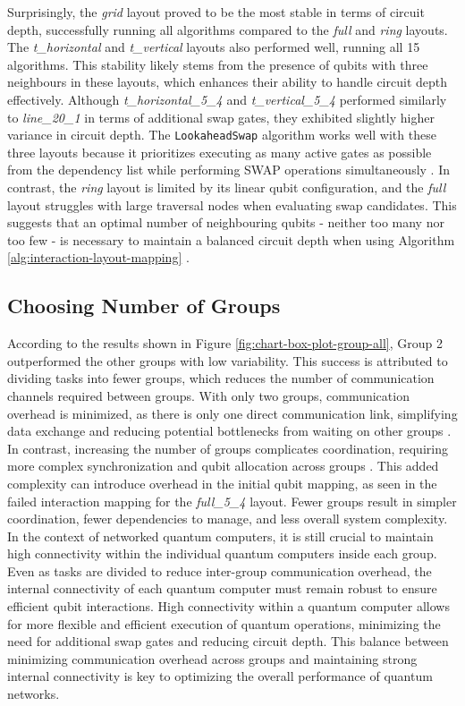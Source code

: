 Surprisingly, the \textit{grid} layout proved to be the most stable in terms of circuit depth, successfully running all algorithms compared to the \textit{full} and \textit{ring} layouts. The \textit{t\_horizontal} and \textit{t\_vertical} layouts also performed well, running all 15 algorithms. This stability likely stems from the presence of qubits with three neighbours in these layouts, which enhances their ability to handle circuit depth effectively. Although \textit{t\_horizontal\_5\_4} and \textit{t\_vertical\_5\_4} performed similarly to \textit{line\_20\_1} in terms of additional swap gates, they exhibited slightly higher variance in circuit depth. The \lstinline{LookaheadSwap} algorithm works well with these three layouts because it prioritizes executing as many active gates as possible from the dependency list while performing SWAP operations simultaneously \cite{zhang_depth_2020}. In contrast, the \textit{ring} layout is limited by its linear qubit configuration, and the \textit{full} layout struggles with large traversal nodes when evaluating swap candidates. This suggests that an optimal number of neighbouring qubits - neither too many nor too few - is necessary to maintain a balanced circuit depth when using Algorithm \ref{alg:interaction-layout-mapping} . \\
\subsection{Choosing Number of Groups}
According to the results shown in Figure \ref{fig:chart-box-plot-group-all}, Group 2 outperformed the other groups with low variability. This success is attributed to dividing tasks into fewer groups, which reduces the number of communication channels required between groups. With only two groups, communication overhead is minimized, as there is only one direct communication link, simplifying data exchange and reducing potential bottlenecks from waiting on other groups \cite{cuomo_optimized_2023}. In contrast, increasing the number of groups complicates coordination, requiring more complex synchronization and qubit allocation across groups \cite{cicconetti_resource_2022}. This added complexity can introduce overhead in the initial qubit mapping, as seen in the failed interaction mapping for the \textit{full\_5\_4} layout. Fewer groups result in simpler coordination, fewer dependencies to manage, and less overall system complexity. \\
In the context of networked quantum computers, it is still crucial to maintain high connectivity within the individual quantum computers inside each group. Even as tasks are divided to reduce inter-group communication overhead, the internal connectivity of each quantum computer must remain robust to ensure efficient qubit interactions. High connectivity within a quantum computer allows for more flexible and efficient execution of quantum operations, minimizing the need for additional swap gates and reducing circuit depth. This balance between minimizing communication overhead across groups and maintaining strong internal connectivity is key to optimizing the overall performance of quantum networks.

